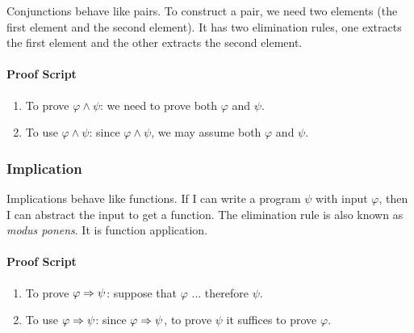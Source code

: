 \documentclass{amsart}
\begin{document}
Conjunctions behave like pairs.
To construct a pair, we need two elements (the first element and the second element).
It has two elimination rules, one extracts the first element and the other extracts the second element.

\paragraph{Proof Script}
\begin{enumerate}
\item To prove $\varphi \wedge \psi$: we need to prove both $\varphi$ and $\psi$.
\item To use $\varphi \wedge \psi$: since $\varphi \wedge \psi$, we may assume both $\varphi$ and $\psi$.
\end{enumerate}

\subsubsection{Implication}
\label{sec:implication}

Implications behave like functions.
If I can write a program $\psi$ with input $\varphi$, then I can abstract the input to get a function.
The elimination rule is also known as \emph{modus ponens}.
It is function application.

\paragraph{Proof Script}
\begin{enumerate}
\item To prove $\varphi \Rightarrow \psi$: suppose that $\varphi$ ... therefore $\psi$.
\item To use $\varphi \Rightarrow \psi$: since $\varphi \Rightarrow \psi$, to prove $\psi$ it suffices to prove $\varphi$.
\end{enumerate}
\end{document}
